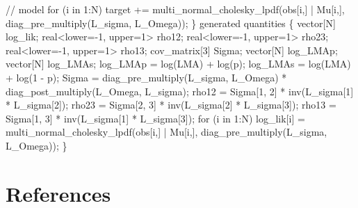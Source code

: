 \documentclass[
  12pt,
  letterpaper,
  DIV=11,
  numbers=noendperiod]{scrartcl}
\newenvironment{Shaded}{\begin{snugshade}}{\end{snugshade}}
\newcommand{\CommentTok}[1]{\textcolor[rgb]{0.37,0.37,0.37}{#1}}
\newcommand{\ControlFlowTok}[1]{\textcolor[rgb]{0.00,0.23,0.31}{#1}}
\newcommand{\DataTypeTok}[1]{\textcolor[rgb]{0.68,0.00,0.00}{#1}}
\newcommand{\DecValTok}[1]{\textcolor[rgb]{0.68,0.00,0.00}{#1}}
\newcommand{\KeywordTok}[1]{\textcolor[rgb]{0.00,0.23,0.31}{#1}}
\newcommand{\NormalTok}[1]{\textcolor[rgb]{0.00,0.23,0.31}{#1}}
\begin{document}
\begin{Shaded}
\begin{Highlighting}[]
  \CommentTok{// model}
  \ControlFlowTok{for}\NormalTok{ (i }\ControlFlowTok{in} \DecValTok{1}\NormalTok{:N)}
     \KeywordTok{target +=}\NormalTok{ multi\_normal\_cholesky\_lpdf(obs[i,] | Mu[i,], diag\_pre\_multiply(L\_sigma, L\_Omega));}
\NormalTok{\}}
\KeywordTok{generated quantities}\NormalTok{ \{}
  \DataTypeTok{vector}\NormalTok{[N] log\_lik;}
  \DataTypeTok{real}\NormalTok{\textless{}}\KeywordTok{lower}\NormalTok{={-}}\DecValTok{1}\NormalTok{, }\KeywordTok{upper}\NormalTok{=}\DecValTok{1}\NormalTok{\textgreater{} rho12;}
  \DataTypeTok{real}\NormalTok{\textless{}}\KeywordTok{lower}\NormalTok{={-}}\DecValTok{1}\NormalTok{, }\KeywordTok{upper}\NormalTok{=}\DecValTok{1}\NormalTok{\textgreater{} rho23;}
  \DataTypeTok{real}\NormalTok{\textless{}}\KeywordTok{lower}\NormalTok{={-}}\DecValTok{1}\NormalTok{, }\KeywordTok{upper}\NormalTok{=}\DecValTok{1}\NormalTok{\textgreater{} rho13;}
  \DataTypeTok{cov\_matrix}\NormalTok{[}\DecValTok{3}\NormalTok{] Sigma;}
  \DataTypeTok{vector}\NormalTok{[N] log\_LMAp;}
  \DataTypeTok{vector}\NormalTok{[N] log\_LMAs;}
\NormalTok{  log\_LMAp = log(LMA) + log(p);}
\NormalTok{  log\_LMAs = log(LMA) + log(}\DecValTok{1}\NormalTok{ {-} p);}
\NormalTok{  Sigma = diag\_pre\_multiply(L\_sigma, L\_Omega)}
\NormalTok{     * diag\_post\_multiply(L\_Omega\textquotesingle{}, L\_sigma);}
\NormalTok{  rho12 = Sigma[}\DecValTok{1}\NormalTok{, }\DecValTok{2}\NormalTok{] * inv(L\_sigma[}\DecValTok{1}\NormalTok{] * L\_sigma[}\DecValTok{2}\NormalTok{]);}
\NormalTok{  rho23 = Sigma[}\DecValTok{2}\NormalTok{, }\DecValTok{3}\NormalTok{] * inv(L\_sigma[}\DecValTok{2}\NormalTok{] * L\_sigma[}\DecValTok{3}\NormalTok{]);}
\NormalTok{  rho13 = Sigma[}\DecValTok{1}\NormalTok{, }\DecValTok{3}\NormalTok{] * inv(L\_sigma[}\DecValTok{1}\NormalTok{] * L\_sigma[}\DecValTok{3}\NormalTok{]);}
  \ControlFlowTok{for}\NormalTok{ (i }\ControlFlowTok{in} \DecValTok{1}\NormalTok{:N)}
\NormalTok{   log\_lik[i] = multi\_normal\_cholesky\_lpdf(obs[i,] | Mu[i,], diag\_pre\_multiply(L\_sigma, L\_Omega));}
\NormalTok{ \}}
\end{Highlighting}
\end{Shaded}

\hypertarget{references}{%
\section*{References}\label{references}}
\end{document}

